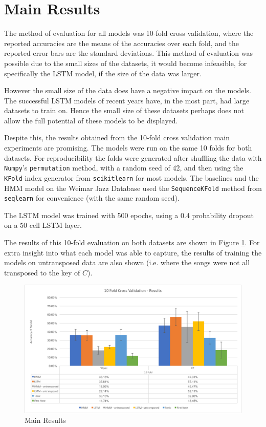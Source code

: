 \documentclass[bsc,singlespacing,logo, parskip, deptreport]{infthesis}
\begin{document}
\section{Main Results} \label{Main Results}

The method of evaluation for all models was 10-fold cross validation, where the reported accuracies are the means of the accuracies over each fold, and the reported error bars are the standard deviations. This method of evaluation was possible due to the small sizes of the datasets, it would become infeasible, for specifically the LSTM model, if the size of the data was larger.

However the small size of the data does have a negative impact on the models. The successful LSTM models of recent years have, in the most part, had large datasets to train on. Hence the small size of these datasets perhaps does not allow the full potential of these models to be displayed.

Despite this, the results obtained from the 10-fold cross validation main experiments are promising. The models were run on the same 10 folds for both datasets. For reproducibility the folds were generated after shuffling the data with {\tt Numpy}'s {\tt permutation} method, with a random seed of 42, and then using the {\tt KFold} index generator from {\tt scikitlearn} \cite{scikit-learn} for most models. The baselines and the HMM model on the Weimar Jazz Database used the {\tt SequenceKFold} method from {\tt seqlearn} for convenience (with the same random seed).

The LSTM model was trained with 500 epochs, using a 0.4 probability dropout \cite{srivastava2014dropout} on a 50 cell LSTM layer.

The results of this 10-fold evaluation on both datasets are shown in Figure \ref{main results}. For extra insight into what each model was able to capture, the results of training the models on untransposed data are also shown (i.e. where the songs were not all transposed to the key of $C$).

\begin{landscape}
  \begin{figure}[h!]
    \caption{Main Results}
    \label{main results}
    \includegraphics[scale=0.95]{10fold}
  \end{figure}
\end{landscape}
\end{document}
